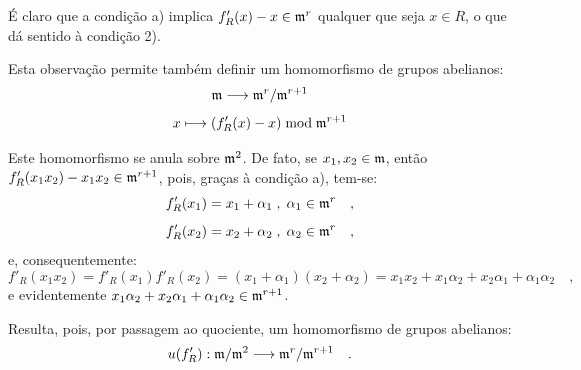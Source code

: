 É claro que a condição a) implica $f'_R(x) - x \in \mathfrak m^r$ qualquer que seja $x \in R$, o que dá sentido à condição 2).

Esta observação permite também definir um homomorfismo de grupos abelianos:
\[
\mathfrak m \longrightarrow \mathfrak m^r/\mathfrak m^{r+1}
\]
\[
x \longmapsto (f'_R(x) - x) \bmod \mathfrak m^{r+1}
\]

Este homomorfismo se anula sobre $\mathfrak m^2$. De fato, se $x_1, x_2 \in \mathfrak m$, então $f'_R(x_1x_2) - x_1x_2 \in \mathfrak m^{r+1}$, pois, graças à condição a), tem-se:
\[
f'_R(x_1) = x_1 + \alpha_1 \; , \; \alpha_1 \in \mathfrak m^r \quad ,
\]
\[
f'_R(x_2) = x_2 + \alpha_2 \; , \; \alpha_2 \in \mathfrak m^r \quad ,
\]
e, consequentemente:
\[
f'_R(x_1x_2) = f'_R(x_1)f'_R(x_2) = (x_1 + \alpha_1)(x_2 + \alpha_2) = x_1x_2 + x_1\alpha_2 + x_2\alpha_1 + \alpha_1\alpha_2 \quad ,
\]
e evidentemente $x_1\alpha_2 + x_2\alpha_1 + \alpha_1\alpha_2 \in \mathfrak m^{r+1}$.

Resulta, pois, por passagem ao quociente, um homomorfismo de grupos abelianos:
\[
u(f'_R) : \mathfrak m/\mathfrak m^2 \longrightarrow \mathfrak m^r/\mathfrak m^{r+1} \quad .
\]
